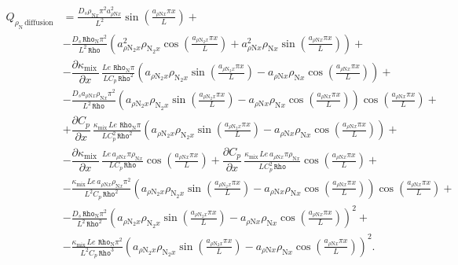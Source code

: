 \documentclass[10pt]{article}
\newcommand{\diff}[2] {\dfrac{\partial #1 }{\partial #2}}
\newcommand{\Rho}{\,\mathtt{Rho}}
\newcommand{\N}{\text{N}}
\newcommand{\mix}{\text{mix}\,}
\newcommand{\DKappaDx}{\diff{\kappa_{\mix}}{x}\,}
\newcommand{\DCpDx}{\diff{C_p}{x}\,}
\newcommand{\diffusion}{\,\text{diffusion}}
\begin{document}
\begin{equation*}
\begin{split}
 Q_{\rho_{\N}\diffusion} &= 
\frac{D_s \rho_{\N x} \pi^{2} a_{ \rho \N x}^{2} }{L^{2}}\sin\left(\frac{a_{ \rho \N x} \pi x}{L}\right)+\\
%
& - \frac{D_s \Rho_{\N} \pi^{2} }{L^{2} \Rho}\left(a_{ \rho \N_2 x}^{2} \rho_{\N_2 x} \cos\left(\frac{a_{ \rho \N_2 x} \pi
x}{L}\right) + a_{ \rho \N x}^{2} \rho_{\N x} \sin\left(\frac{a_{ \rho \N x} \pi x}{L}\right)\right) +\\ 
%
& - \DKappaDx \frac{ Le \, \Rho_{\N} \pi }{L C_p\Rho^{2}}\left(a_{ \rho \N_2 x} \rho_{\N_2 x} \sin\left(\frac{a_{ \rho \N_2 x} \pi
x}{L}\right) - a_{ \rho \N x} \rho_{\N x} \cos\left(\frac{a_{ \rho \N x} \pi x}{L}\right)\right) +\\
%
& - \frac{D_s a_{ \rho \N x} \rho_{\N x} \pi^{2} }{L^{2} \Rho}\left(a_{ \rho \N_2 x} \rho_{\N_2 x} \sin\left(\frac{a_{ \rho \N_2
x} \pi x}{L}\right) - a_{ \rho \N x} \rho_{\N x} \cos\left(\frac{a_{ \rho \N x} \pi x}{L}\right)\right) \cos\left(\frac{a_{ \rho
\N x} \pi x}{L}\right) +\\ 
%
& + \DCpDx \frac{ \kappa_{\mix} Le \, \Rho_{\N} \pi }{L C_p^{2} \Rho^{2}}\left(a_{ \rho \N_2 x} \rho_{\N_2 x} \sin\left(\frac{a_{
\rho \N_2 x} \pi x}{L}\right) - a_{ \rho \N x} \rho_{\N x} \cos\left(\frac{a_{ \rho \N x} \pi x}{L}\right)\right) +\\
%
& - \DKappaDx \frac{ Le \, a_{ \rho \N x} \pi \rho_{\N x} }{L C_p\Rho}\cos\left(\frac{a_{ \rho \N x} \pi x}{L}\right) + \DCpDx
\frac{ \kappa_{\mix} Le \, a_{ \rho \N x} \pi \rho_{\N x} }{L C_p^{2} \Rho}\cos\left(\frac{a_{ \rho \N x} \pi x}{L}\right) +\\
%
& - \frac{\kappa_{\mix} Le \, a_{ \rho \N x} \rho_{\N x} \pi^{2} }{L^{2} C_p \Rho^{2}} \left(a_{ \rho \N_2 x} \rho_{\N_2 x}
\sin\left(\frac{a_{ \rho \N_2 x} \pi x}{L}\right) - a_{ \rho \N x} \rho_{\N x} \cos\left(\frac{a_{ \rho \N x} \pi
x}{L}\right)\right) \cos\left(\frac{a_{ \rho \N x} \pi x}{L}\right)+\\
%
& - \frac{D_s \Rho_{\N} \pi^{2} }{L^{2} \Rho^{2}}\left(a_{ \rho \N_2 x} \rho_{\N_2 x} \sin\left(\frac{a_{ \rho \N_2 x} \pi
x}{L}\right) - a_{ \rho \N x} \rho_{\N x} \cos\left(\frac{a_{ \rho \N x} \pi x}{L}\right)\right)^{2} +\\
%
& - \frac{\kappa_{\mix} Le \, \Rho_{\N} \pi^{2} }{L^{2} C_p \Rho^{3}}\left(a_{ \rho \N_2 x} \rho_{\N_2 x} \sin\left(\frac{a_{ \rho
\N_2 x} \pi x}{L}\right) - a_{ \rho \N x} \rho_{\N x} \cos\left(\frac{a_{ \rho \N x} \pi x}{L}\right)\right)^{2}.\\
%
\end{split}
\end{equation*}
\end{document}
